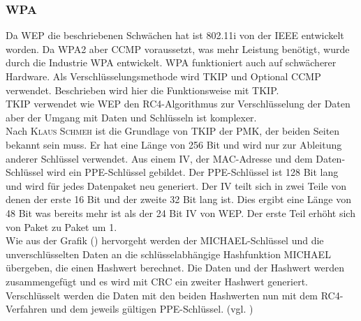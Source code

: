 \subsubsection{\ac{WPA}} 
Da \ac{WEP} die beschriebenen Schwächen hat ist 802.11i von der \ac{IEEE} entwickelt worden. Da \ac{WPA2} aber \ac{CCMP} voraussetzt, was mehr Leistung benötigt, wurde durch die Industrie \ac{WPA} entwickelt. \ac{WPA} funktioniert auch auf schwächerer Hardware. Als Verschlüsselungsmethode wird \ac{TKIP} und Optional \ac{CCMP} verwendet. Beschrieben wird hier die Funktionsweise mit \ac{TKIP}. \\
\ac{TKIP} verwendet wie \ac{WEP} den RC4-Algorithmus zur Verschlüsselung der Daten aber der Umgang mit Daten und Schlüsseln ist komplexer. \\
Nach \textsc{Klaus Schmeh} \cite{SWB-378541420} ist die Grundlage von \ac{TKIP} der \ac{PMK}, der beiden Seiten bekannt sein muss. Er hat eine Länge von 256 Bit und wird nur zur Ableitung anderer Schlüssel verwendet. Aus einem \ac{IV}, der MAC-Adresse und dem Daten-Schlüssel wird ein \ac{PPE}-Schlüssel gebildet. Der \ac{PPE}-Schlüssel ist 128 Bit lang und wird für jedes Datenpaket neu generiert.
Der \ac{IV} teilt sich in zwei Teile von denen der erste 16 Bit und der zweite 32 Bit lang ist. Dies ergibt eine Länge von 48 Bit was bereits mehr ist als der 24 Bit \ac{IV} von WEP. Der erste Teil erhöht sich von Paket zu Paket um 1.\\
Wie aus der Grafik () hervorgeht werden der MICHAEL-Schlüssel und die unverschlüsselten Daten an die schlüsselabhängige Hashfunktion MICHAEL übergeben, die einen Hashwert berechnet. Die Daten und der Hashwert werden zusammengefügt und es wird mit CRC ein zweiter Hashwert generiert. Verschlüsselt werden die Daten mit den beiden Hashwerten nun mit dem RC4-Verfahren und dem jeweils gültigen \ac{PPE}-Schlüssel. (vgl. \cite{SWB-378541420})

